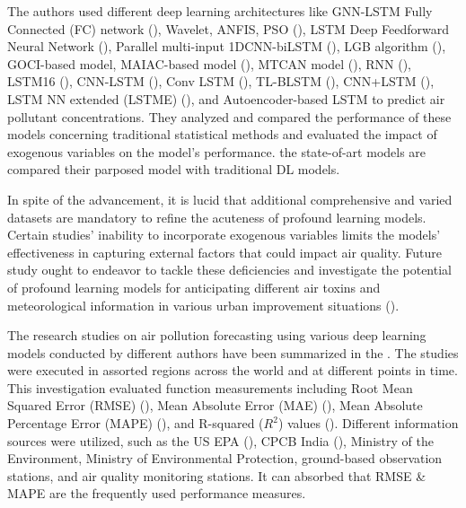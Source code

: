 \documentclass[a4paper, fleqn]{cas-sc}
\theoremstyle{definition}
\theoremstyle{remark}
\begin{document}
The authors used different deep learning architectures like GNN-LSTM Fully Connected (FC) network (\cite{li2023nested}),  Wavelet,  ANFIS,  PSO (\cite{pruthi2022low}),  LSTM Deep Feedforward Neural Network (\cite{menares2021forecasting}),  Parallel multi-input 1DCNN-biLSTM (\cite{zhu2023deep}),  LGB algorithm (\cite{kim2022short}),  GOCI-based model,  MAIAC-based model (\cite{lee2021potential}),  MTCAN model (\cite{samal2021multi}),  RNN (\cite{kurnaz2022prediction}),  LSTM16 (\cite{das2022prediction}),  CNN-LSTM (\cite{natsagdorj2023prediction}),  Conv LSTM (\cite{zhu2023deep}),  TL-BLSTM (\cite{ma2019improving}),  CNN+LSTM (\cite{qin2019novel}),  LSTM NN extended (LSTME) (\cite{li2017long}),  and Autoencoder-based LSTM to predict air pollutant concentrations. They analyzed and compared the performance of these models concerning traditional statistical methods and evaluated the impact of exogenous variables on the model's performance. the state-of-art models are compared their parposed model with traditional DL models.

In spite of the advancement,  it is lucid that additional comprehensive and varied datasets are mandatory to refine the acuteness of profound learning models. Certain studies' inability to incorporate exogenous variables limits the models' effectiveness in capturing external factors that could impact air quality. Future study ought to endeavor to tackle these deficiencies and investigate the potential of profound learning models for anticipating different air toxins and meteorological information in various urban improvement situations (\cite{samal2021multi}).

The research studies on air pollution forecasting using various deep learning models conducted by different authors have been summarized in the . The studies were executed in assorted regions across the world and at different points in time. This investigation evaluated function measurements including Root Mean Squared Error (RMSE) (\cite{das2022prediction, kurnaz2022prediction, samal2021multi, kim2022short, zhu2023investigation, menares2021forecasting, nath2021long, du2019deep, li2017long, qin2019novel, ma2019improving, natsagdorj2023prediction}),  Mean Absolute Error (MAE) (\cite{li2023nested, menares2021forecasting, zhu2023investigation, ma2019improving, nath2021long, du2019deep, li2017long}),  Mean Absolute Percentage Error (MAPE) (\cite{li2017long, ma2019improving}),  and R-squared ($R^2$) values (\cite{eren2023predicting, lee2021potential, kim2022short, zhu2023investigation, menares2021forecasting}). Different information sources were utilized,  such as the US EPA (\cite{li2023nested}),  CPCB India (\cite{nath2021long, samal2021multi, pruthi2022low}),  Ministry of the Environment,  Ministry of Environmental Protection,  ground-based observation stations,  and air quality monitoring stations. It can absorbed that RMSE \& MAPE are the frequently used performance measures.
 
\end{document}
